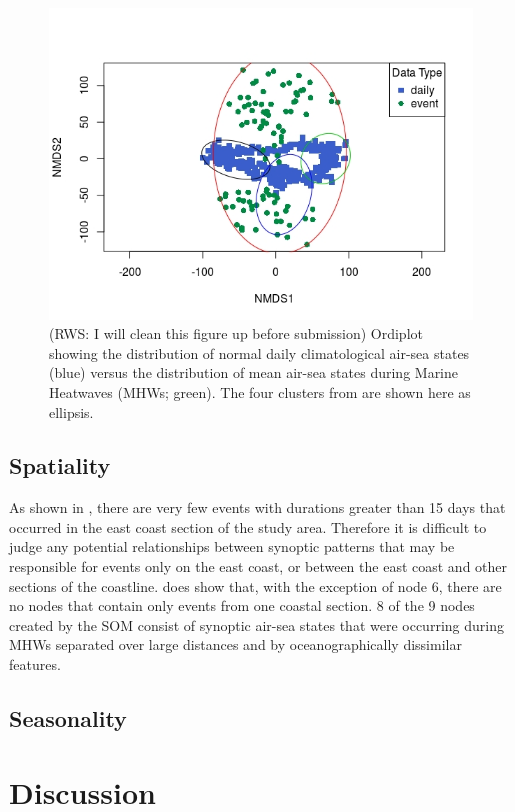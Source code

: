 \documentclass[a4paper,10pt,review]{elsarticle}
\begin{document}
\begin{figure}
\includegraphics[width=1.0\textwidth]{figure_7.jpeg}
\caption{(RWS: I will clean this figure up before submission) Ordiplot showing the distribution of normal daily climatological air-sea states (blue) versus the distribution of mean air-sea states during Marine Heatwaves (MHWs; green). The four clusters from  are shown here as ellipsis.}
\label{figure7}
\end{figure}

\subsection{Spatiality}
As shown in , there are very few events with durations greater than 15 days that occurred in the east coast section of the study area. Therefore it is difficult to judge any potential relationships between synoptic patterns that may be responsible for events only on the east coast, or between the east coast and other sections of the coastline.  does show that, with the exception of node 6, there are no nodes that contain only events from one coastal section. 8 of the 9 nodes created by the SOM consist of synoptic air-sea states that were occurring during MHWs separated over large distances and by oceanographically dissimilar features.

\subsection{Seasonality}

\section{Discussion}
\end{document}
